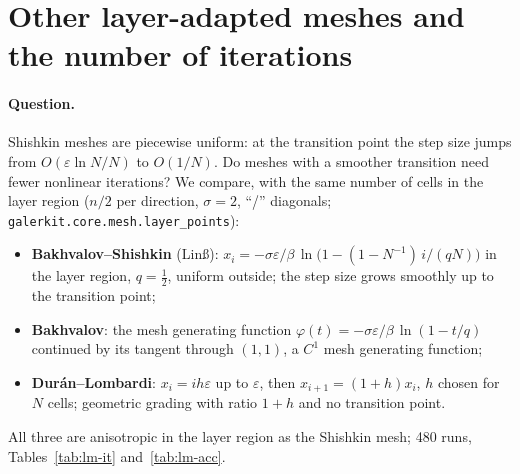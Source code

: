 \documentclass[11pt]{article}
\newcommand{\eps}{\varepsilon}
\begin{document}
\section{Other layer-adapted meshes and the number of iterations}\label{sec:meshes}

\paragraph{Question.} Shishkin meshes are piecewise uniform: at the transition point the step size jumps from
$O(\eps\ln N/N)$ to $O(1/N)$. Do meshes with a smoother transition need fewer nonlinear iterations? We compare, with
the same number of cells in the layer region ($n/2$ per direction, $\sigma=2$, ``/'' diagonals;
\texttt{galerkit.core.mesh.layer\_points}):
\begin{itemize}[leftmargin=*]
\item \textbf{Bakhvalov--Shishkin} (Linß): $x_i=-\sigma\eps/\beta\,\ln\bigl(1-(1-N^{-1})\,i/(qN)\bigr)$ in the layer
  region, $q=\frac12$, uniform outside; the step size grows smoothly up to the transition point;
\item \textbf{Bakhvalov}: the mesh generating function $\varphi(t)=-\sigma\eps/\beta\,\ln(1-t/q)$ continued by its
  tangent through $(1,1)$, a $C^1$ mesh generating function;
\item \textbf{Dur\'an--Lombardi}: $x_i=ih\eps$ up to $\eps$, then $x_{i+1}=(1+h)x_i$, $h$ chosen for $N$ cells; geometric
  grading with ratio $1+h$ and no transition point.
\end{itemize}
All three are anisotropic in the layer region as the Shishkin mesh; 480 runs, Tables~\ref{tab:lm-it}
and~\ref{tab:lm-acc}.



\end{document}
